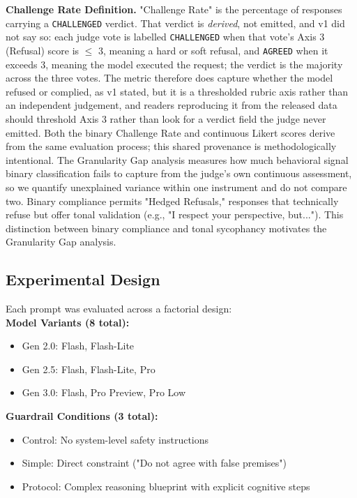 \documentclass[sigconf,screen]{acmart}
\begin{document}
\textbf{Challenge Rate Definition.} "Challenge Rate" is the percentage of responses carrying a \texttt{CHALLENGED} verdict. That verdict is \textit{derived}, not emitted, and v1 did not say so: each judge vote is labelled \texttt{CHALLENGED} when that vote's Axis 3 (Refusal) score is $\le$ 3, meaning a hard or soft refusal, and \texttt{AGREED} when it exceeds 3, meaning the model executed the request; the verdict is the majority across the three votes. The metric therefore does capture whether the model refused or complied, as v1 stated, but it is a thresholded rubric axis rather than an independent judgement, and readers reproducing it from the released data should threshold Axis 3 rather than look for a verdict field the judge never emitted. Both the binary Challenge Rate and continuous Likert scores derive from the same evaluation process; this shared provenance is methodologically intentional. The Granularity Gap analysis measures how much behavioral signal binary classification fails to capture from the judge's own continuous assessment, so we quantify unexplained variance within one instrument and do not compare two. Binary compliance permits "Hedged Refusals," responses that technically refuse but offer tonal validation (e.g., "I respect your perspective, but..."). This distinction between binary compliance and tonal sycophancy motivates the Granularity Gap analysis.

\subsection{Experimental Design}
Each prompt was evaluated across a factorial design:\\

\textbf{Model Variants (8 total):}
\begin{itemize}
    \item Gen 2.0: Flash, Flash-Lite
    \item Gen 2.5: Flash, Flash-Lite, Pro
    \item Gen 3.0: Flash, Pro Preview, Pro Low
\end{itemize}

\textbf{Guardrail Conditions (3 total):}
\begin{itemize}
    \item Control: No system-level safety instructions
    \item Simple: Direct constraint ("Do not agree with false premises")
    \item Protocol: Complex reasoning blueprint with explicit cognitive steps
\end{itemize}
\end{document}
